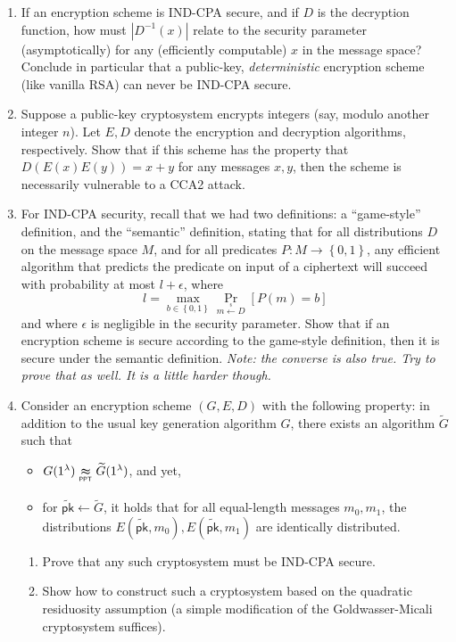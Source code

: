 \documentclass[12pt]{article}
\newcommand{\ppt}{\ensuremath{\mathsf{PPT}}}
\newcommand{\indppt}{\underset{{ }^{\ppt}}{\thickapprox}}
\newcommand{\inv}{^{-1}} %
\newcommand{\set}[1]{\left\{ #1 \right\}}
\newcommand{\pr}[2]{\Pr_{#1}\left[#2\right]}
\def\rand{\stackrel{{}_{\$}}{\leftarrow}} %
\newcommand{\bit}{\set{0,1}}
\renewcommand{\to}{\longrightarrow}
\begin{document}
\begin{enumerate}

  \item If an encryption scheme is IND-CPA secure, and if \(D\) is the
	decryption function, how must \(|D\inv(x)|\) relate to the security
	parameter (asymptotically) for any (efficiently computable) \(x\) in the
	message space?  Conclude in particular that a public-key,
	\emph{deterministic} encryption scheme (like vanilla RSA) can never be
	IND-CPA secure.

  \item Suppose a public-key cryptosystem encrypts integers (say, modulo
	another integer \(n\)).  Let \(E,D\) denote the encryption and decryption
	algorithms, respectively.  Show that if this scheme has the property that
	\(D(E(x)E(y))\allowbreak = x+y\) for any messages \(x,y\), then the scheme
	is necessarily vulnerable to a CCA2 attack.

  \item For IND-CPA security, recall that we had two definitions: a ``game-style''
  definition, and the ``semantic'' definition, stating that for all
  distributions \(D\) on the message space \(M\), and for all predicates \(P:
  M\to \bit\), any efficient algorithm that predicts the predicate on input of
  a ciphertext will succeed with probability at most \(l+\epsilon\), where \[l
  = \max_{b\in \bit} \pr{m\rand D}{P(m)=b}\] and where \(\epsilon\) is
  negligible in the security parameter. Show that if an encryption scheme is
  secure according to the game-style definition, then it is secure under the
  semantic definition.  \emph{Note: the converse is also true.  Try to prove
  that as well.  It is a little harder though.}

  \item Consider an encryption scheme \((G,E,D)\) with the following property:
	in addition to the usual key generation algorithm \(G\), there exists an
	algorithm \(\widetilde G\) such that
	\begin{itemize}[noitemsep]
	  \item \(G(1^\lambda)\indppt \widetilde G(1^\lambda)\), and yet,
	  \item for \(\widetilde{\mathsf{pk}}\leftarrow \widetilde G\), it holds
		that for all equal-length messages \(m_0,m_1\), the distributions
		\(E(\widetilde{\mathsf{pk}},m_0), E(\widetilde{\mathsf{pk}},m_1)\) are
		identically distributed.
	\end{itemize}
	\begin{enumerate}[noitemsep]
	  \item Prove that any such cryptosystem must be IND-CPA secure.
	  \item Show how to construct such a cryptosystem based on the quadratic
		residuosity assumption (a simple modification of the Goldwasser-Micali
		cryptosystem suffices).
	\end{enumerate}

\end{enumerate}

\end{document}
